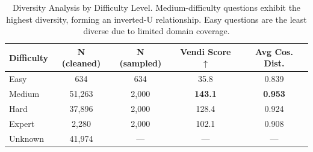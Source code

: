 \begin{table}[t]
\centering
\caption{Diversity Analysis by Difficulty Level. Medium-difficulty questions exhibit the highest diversity, forming an inverted-U relationship. Easy questions are the least diverse due to limited domain coverage.}
\label{tab:difficulty_diversity}
\begin{tabular}{lcccc}
\toprule
\textbf{Difficulty} & \textbf{N (cleaned)} & \textbf{N (sampled)} & \textbf{Vendi Score} $\uparrow$ & \textbf{Avg Cos. Dist.} \\
\midrule
Easy & 634 & 634 & 35.8 & 0.839 \\
Medium & 51,263 & 2,000 & \textbf{143.1} & \textbf{0.953} \\
Hard & 37,896 & 2,000 & 128.4 & 0.924 \\
Expert & 2,280 & 2,000 & 102.1 & 0.908 \\
\midrule
Unknown & 41,974 & --- & --- & --- \\
\bottomrule
\end{tabular}
\end{table}
